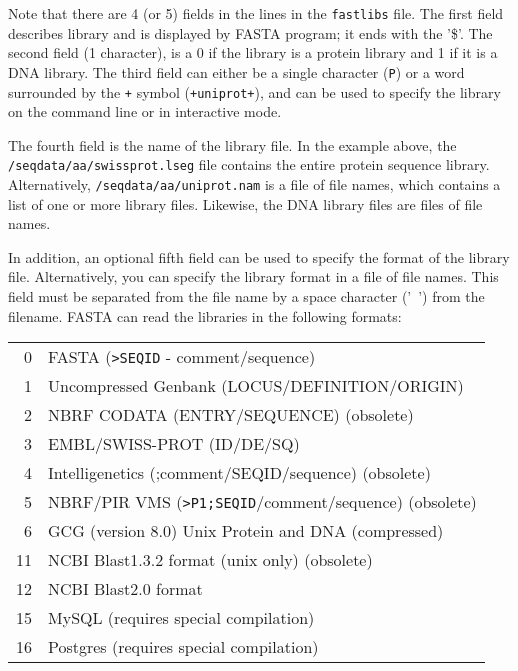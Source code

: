 \documentclass[11pt]{article}
\begin{document}
Note that there are 4 (or 5) fields in the lines in the
\texttt{fastlibs} file.  The first field describes library and is
displayed by FASTA program; it ends with the '\$'.  The second field
(1 character), is a 0 if the library is a protein library and 1 if it
is a DNA library.  The third field can either be a single character
(\texttt{P}) or a word surrounded by the \texttt{+} symbol
(\texttt{+uniprot+}), and can be used to specify the library on the command line or in interactive mode.

The fourth field is the name of the library file.  In the example
above, the \texttt{/seqdata/aa/swissprot.lseg} file contains the
entire protein sequence library.  Alternatively,
\texttt{/seqdata/aa/uniprot.nam} is a file of file names, which
contains a list of one or more library files.  Likewise, the DNA
library files are files of file names.

In addition, an optional fifth field can be used to specify the format
of the library file.  Alternatively, you can specify the library
format in a file of file names.  This field must be separated from the
file name by a space character ('\ ') from the filename.  FASTA can
read the libraries in the following formats:\\

\begin{tabular}{r l}
0 & FASTA (\texttt{>SEQID} - comment/sequence) \\
1 & Uncompressed Genbank (LOCUS/DEFINITION/ORIGIN)\\
2 & NBRF CODATA (ENTRY/SEQUENCE) (obsolete)\\
3 & EMBL/SWISS-PROT (ID/DE/SQ)\\
4 & Intelligenetics (;comment/SEQID/sequence) (obsolete)\\
5 & NBRF/PIR VMS (\texttt{>P1;SEQID}/comment/sequence) (obsolete)\\
6 & GCG (version 8.0) Unix Protein and DNA (compressed)\\
11 & NCBI Blast1.3.2 format  (unix only) (obsolete)\\
12 & NCBI Blast2.0 format\\
15 & MySQL (requires special compilation) \\
16 & Postgres (requires special compilation) \\
\end{tabular}
\end{document}
